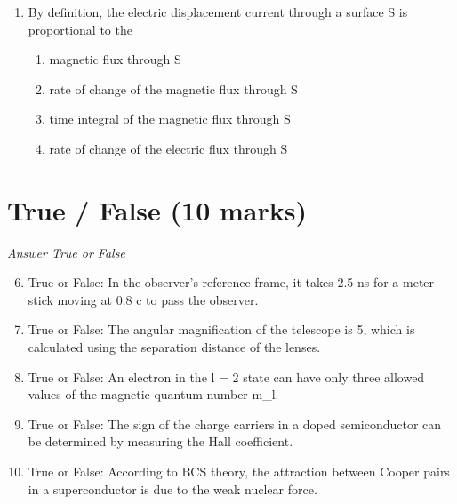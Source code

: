 \documentclass[12pt]{article}
\begin{document}
\begin{enumerate}[label=\arabic*.]
\begin{enumerate}[label=(\alph*)]
    \item rate of change of the electric flux through S
    \item electric flux through S
    \item time integral of the magnetic flux through S
    \item rate of change of the magnetic flux through S
\end{enumerate}
\item By definition, the electric displacement current through a surface S is proportional to the
\begin{enumerate}[label=(\alph*)]
    \item magnetic flux through S
    \item rate of change of the magnetic flux through S
    \item time integral of the magnetic flux through S
    \item rate of change of the electric flux through S
\end{enumerate}
\end{enumerate}

\section*{True / False (10 marks)}
\textit{Answer True or False}
\begin{enumerate}[label=\arabic*.]
\setcounter{enumi}{5}
\item True or False: In the observer's reference frame, it takes 2.5 ns for a meter stick moving at 0.8 c to pass the observer.
\item True or False: The angular magnification of the telescope is 5, which is calculated using the separation distance of the lenses.
\item True or False: An electron in the l = 2 state can have only three allowed values of the magnetic quantum number m\_l.
\item True or False: The sign of the charge carriers in a doped semiconductor can be determined by measuring the Hall coefficient.
\item True or False: According to BCS theory, the attraction between Cooper pairs in a superconductor is due to the weak nuclear force.
\end{enumerate}
\end{document}
